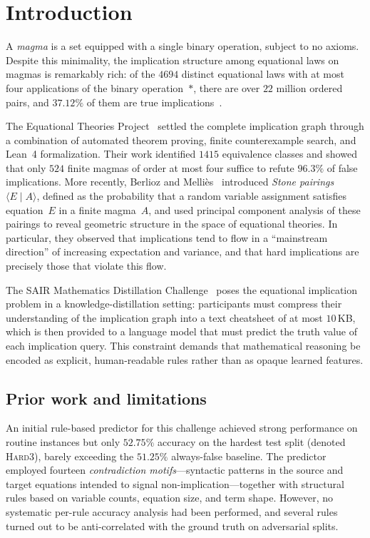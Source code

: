 \section{Introduction}\label{sec:intro}

A \emph{magma} is a set equipped with a single binary operation, subject to
no axioms.  Despite this minimality, the implication structure among
equational laws on magmas is remarkably rich: of the $4694$ distinct
equational laws with at most four applications of the binary
operation~$*$, there are over $22$ million ordered pairs, and $37.12\%$
of them are true implications~\cite{bolan2025equational}.

The Equational Theories Project~\cite{bolan2025equational} settled the
complete implication graph through a combination of automated theorem
proving, finite counterexample search, and Lean~4 formalization.  Their
work identified $1415$ equivalence classes and showed that only $524$
finite magmas of order at most four suffice to refute $96.3\%$ of false
implications.  More recently, Berlioz and Melli\`es~\cite{berlioz2026latent}
introduced \emph{Stone pairings} $\langle E \mid A \rangle$, defined as
the probability that a random variable assignment satisfies equation~$E$
in a finite magma~$A$, and used principal component analysis of these
pairings to reveal geometric structure in the space of equational
theories.  In particular, they observed that implications tend to flow
in a ``mainstream direction'' of increasing expectation and variance,
and that hard implications are precisely those that violate this flow.

The SAIR Mathematics Distillation Challenge~\cite{sair2026challenge}
poses the equational implication problem in a knowledge-distillation
setting: participants must compress their understanding of the
implication graph into a text cheatsheet of at most $10$\,KB, which is
then provided to a language model that must predict the truth value of
each implication query.  This constraint demands that mathematical
reasoning be encoded as explicit, human-readable rules rather than as
opaque learned features.

\subsection{Prior work and limitations}
An initial rule-based predictor for this challenge achieved strong
performance on routine instances but only $52.75\%$ accuracy on the
hardest test split (denoted \textsc{Hard3}), barely exceeding the
$51.25\%$ always-false baseline.  The predictor employed fourteen
\emph{contradiction motifs}---syntactic patterns in the source and
target equations intended to signal non-implication---together with
structural rules based on variable counts, equation size, and
term shape.  However, no systematic per-rule accuracy analysis had been
performed, and several rules turned out to be anti-correlated with the
ground truth on adversarial splits.

